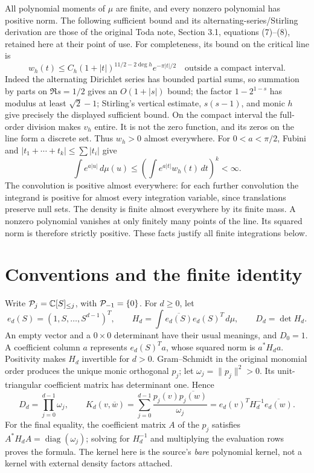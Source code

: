 All polynomial moments of \(\mu\) are finite, and every nonzero
polynomial has positive norm. The following sufficient bound and its
alternating-series/Stirling derivation are those of the original Toda
note, Section 3.1, equations (7)--(8), retained here at their point of
use. For completeness, its bound on the critical line is
\[
 w_h(t)\leq C_h(1+|t|)^{11/2-2\deg h}e^{-\pi|t|/2}
 \quad\text{outside a compact interval}.
\]
Indeed the alternating Dirichlet series has bounded partial sums, so
summation by parts on \(\Re s=1/2\) gives an \(O(1+|s|)\) bound; the
factor \(1-2^{1-s}\) has modulus at least \(\sqrt2-1\); Stirling's
vertical estimate, \(s(s-1)\), and monic \(h\) give precisely the
displayed sufficient bound. On the compact interval the full-order
division makes \(v_h\) entire. It is not the zero function, and its
zeros on the line form a discrete set. Thus \(w_h>0\) almost everywhere.
For \(0<a<\pi/2\), Fubini and \(|t_1+\cdots+t_k|\leq\sum|t_i|\) give
\[
 \int e^{a|u|}\,d\mu(u)
 \leq\left(\int e^{a|t|}w_h(t)\,dt\right)^k<\infty.
\]
The convolution is positive almost everywhere: for each further
convolution the integrand is positive for almost every integration
variable, since translations preserve null sets. The density is finite
almost everywhere by its finite mass. A nonzero polynomial vanishes at
only finitely many points of the line. Its squared norm is therefore
strictly positive. These facts justify all finite integrations below.

\section{Conventions and the finite identity}\label{mrfinite:sec:statement}

Write \(\mathcal P_j=\mathbb C[S]_{\leq j}\), with \(\mathcal P_{-1}=\{0\}\).
For \(d\geq0\), let
\[
 e_d(S)=(1,S,\ldots,S^{d-1})^T,\qquad
 H_d=\int\overline{e_d(S)}e_d(S)^T\,d\mu,
 \qquad D_d=\det H_d.
\]
An empty vector and a \(0\times0\) determinant have their usual meanings,
and \(D_0=1\). A coefficient column \(a\) represents \(e_d(S)^Ta\),
whose squared norm is \(a^*H_da\). Positivity makes \(H_d\) invertible
for \(d>0\). Gram--Schmidt in the original monomial order produces the
unique monic orthogonal \(p_j\); let \(\omega_j=\|p_j\|^2>0\). Its
unit-triangular coefficient matrix has determinant one. Hence
\begin{equation}\label{mrfinite:eq:kernel}
 D_d=\prod_{j=0}^{d-1}\omega_j,
 \qquad
 K_d(v,\overline w)=\sum_{j=0}^{d-1}
      \frac{p_j(v)\overline{p_j(w)}}{\omega_j}
   =e_d(v)^TH_d^{-1}\overline{e_d(w)}.
\end{equation}
For the final equality, the coefficient matrix \(A\) of the \(p_j\)
satisfies \(A^*H_dA=\operatorname{diag}(\omega_j)\); solving for
\(H_d^{-1}\) and multiplying the evaluation rows proves the formula.
The kernel here is the source's \emph{bare} polynomial kernel, not a
kernel with external density factors attached.

